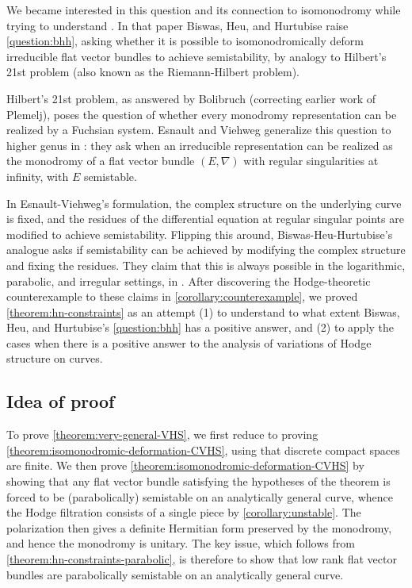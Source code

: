 \documentclass[12 pt]{amsart}
\theoremstyle{plain}
\theoremstyle{definition}
\theoremstyle{remark}
\numberwithin{equation}{section}
\begin{document}
We became interested in this question and its connection to isomonodromy while
trying to understand \cite{BHH:logarithmic}. In that paper Biswas, Heu, and
Hurtubise raise \autoref{question:bhh}, asking whether it is possible to isomonodromically deform irreducible flat vector bundles to achieve semistability, by analogy to Hilbert's 21st problem (also known as the Riemann-Hilbert problem). 

Hilbert's 21st problem, as answered by  Bolibruch \cite{bolibruch1995riemann} (correcting earlier work of Plemelj), poses the question of whether every monodromy representation can be realized by a Fuchsian system. Esnault and Viehweg generalize this question to higher genus in \cite{esnault1999semistable}: they ask when an irreducible representation can be realized as the monodromy of a flat vector bundle $(E, \nabla)$ with regular singularities at infinity, with $E$ semistable.  
 
 In Esnault-Viehweg's formulation, the complex structure on the underlying curve
 is fixed, and the residues of the differential equation at regular singular
 points are modified to achieve semistability. Flipping this around,
 Biswas-Heu-Hurtubise's analogue asks if semistability can be achieved by
 modifying the complex structure and fixing the residues. They claim that this
 is always possible in the logarithmic, parabolic, and irregular settings, in
 \cite{BHH:logarithmic, BHH:parabolic, BHH:irregular}. After discovering the
 Hodge-theoretic counterexample to these claims in
 \autoref{corollary:counterexample}, we proved \autoref{theorem:hn-constraints}
 as an attempt  (1) to understand to what extent Biswas, Heu, and Hurtubise's
 \autoref{question:bhh} has a positive answer, and (2) to apply the cases when there is a positive answer to the analysis of variations of Hodge structure on curves.

\subsection{Idea of proof}
\label{subsection:idea-of-proof}

To prove \autoref{theorem:very-general-VHS}, we first reduce to proving
\autoref{theorem:isomonodromic-deformation-CVHS}, using that discrete compact
spaces are finite.
We then prove \autoref{theorem:isomonodromic-deformation-CVHS} by showing that
any flat vector bundle satisfying the hypotheses of the theorem is forced to be (parabolically) semistable on an analytically general curve, whence the Hodge
filtration consists of a single piece by \autoref{corollary:unstable}.
The polarization then gives a definite Hermitian form preserved by the monodromy, and hence
the monodromy is unitary.
The key issue, which follows from \autoref{theorem:hn-constraints-parabolic},
is therefore to show that low rank flat vector bundles %
are parabolically semistable
on an analytically general curve.
\end{document}
